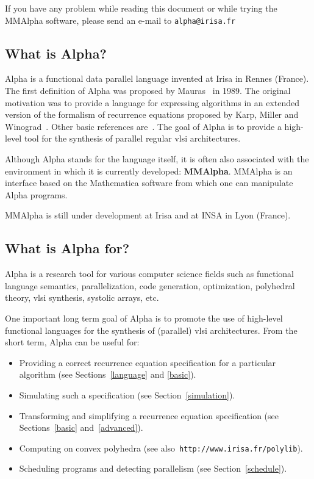 \documentclass[12pt]{article}
\makeatletter
\newcommand{\emailmmalfa}{\texttt{alpha@irisa.fr}}
\newcommand{\Alpha}{{\sc Alpha}}
\newcommand{\MMA}{{\sc MMAlpha}}
\newcommand{\irisa}{ Irisa}
\newcommand{\vlsi}{{\sc vlsi}}
\newcommand{\alfa}{\Alpha}
\newcommand{\mmalfa}{\MMA}
\newcommand{\mma}{{Mathematica}}
\newcommand{\polylib}{{\sc polylib}}
\makeatother
\begin{document}
If you have any problem while reading this document or while 
trying the
\mmalfa{} software, please send an e-mail to \emailmmalfa{}

\subsection*{What is \Alpha?}
\label{Whatis}
\nocite{Alpha97a,BQRR,Ris21,DupontQuRi95,DuRiRo97,QuRaRi96a,QuRaRi97a}
{\Alpha} is a functional data parallel 
language invented at 
{\irisa} in Rennes (France). 
The first definition of \alfa{} was proposed by Mauras~\cite{Mauras89} 
in 1989. The original motivation was to provide 
a language for expressing algorithms in an extended version of 
the formalism of recurrence equations
proposed by Karp, Miller and Winograd~\cite{KaMiWi67}. 
Other basic references are~\cite{Moldovan82,Quinton84c,Rajopadhye86}.
The goal of \alfa{} is to provide
a high-level tool for the synthesis of parallel regular {\vlsi} architectures.

Although {\Alpha} stands for the language itself, it is often also
associated with the environment in which it is currently developed:
{\bf {\MMA}}. {\MMA} is an interface based on the \mma{}
software from which one can manipulate {\Alpha} programs.

\mmalfa{} is still under development at \irisa{} and at INSA in Lyon (France).

\subsection*{What is {\Alpha} for?}
\label{whatfor}
{\Alpha} is a research tool for 
various computer science fields such as functional language semantics,
parallelization, code generation, optimization, polyhedral theory,
{\vlsi} synthesis, systolic arrays, etc.

One important long term goal of \alfa{} is to promote the use of high-level 
functional languages for the synthesis of (parallel) {\vlsi}
architectures. From the short term, Alpha can be useful
for:
\begin{itemize}
\item Providing a correct recurrence equation specification for a particular 
algorithm (see Sections~\ref{language} and \ref{basic}).
\item Simulating such a specification (see Section~\ref{simulation}).
\item Transforming and simplifying a recurrence equation specification (see 
Sections~\ref{basic} and~\ref{advanced}).
\item Computing on convex polyhedra 
(see also~\texttt{{http://www.irisa.fr/polylib}}).
\index{polylib@\polylib}
\item Scheduling programs and detecting parallelism 
(see Section~\ref{schedule}).
\end{itemize}
\end{document}
